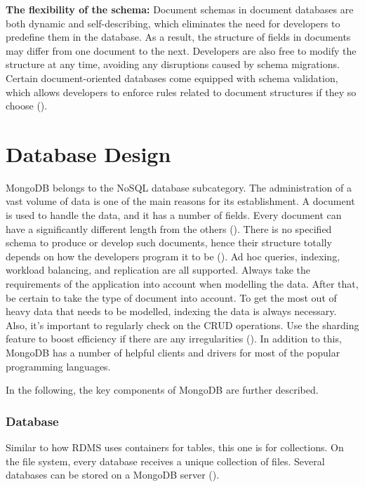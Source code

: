 \textbf{The flexibility of the schema:} Document schemas in document databases are both dynamic and self-describing, which eliminates the need for developers to predefine them in the database. As a result, the structure of fields in documents may differ from one document to the next. Developers are also free to modify the structure at any time, avoiding any disruptions caused by schema migrations. Certain document-oriented databases come equipped with schema validation, which allows developers to enforce rules related to document structures if they so choose (\cite{mongodb-mongo}).




\section{Database Design}
MongoDB belongs to the NoSQL database subcategory. The administration of a vast volume of data is one of the main reasons for its establishment. A document is used to handle the data, and it has a number of fields. Every document can have a significantly different length from the others (\cite{mungekar_2019}). There is no specified schema to produce or develop such documents, hence their structure totally depends on how the developers program it to be (\cite{taylor_2020}).
Ad hoc queries, indexing, workload balancing, and replication are all supported.
Always take the requirements of the application into account when modelling the data. After that, be certain to take the type of document into account. To get the most out of heavy data that needs to be modelled, indexing the data is always necessary. Also, it's important to regularly check on the CRUD operations. Use the sharding feature to boost efficiency if there are any irregularities (\cites{taylor_2020}{mungekar_2019}).
In addition to this, MongoDB has a number of helpful clients and drivers for most of the popular programming languages.

In the following, the key components of MongoDB are further described.

\subsubsection{Database}
Similar to how RDMS uses containers for tables, this one is for collections. On the file system, every database receives a unique collection of files. Several databases can be stored on a MongoDB server (\cite{taylor_2020}).

